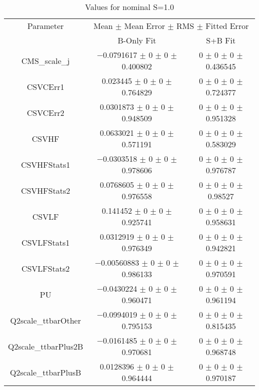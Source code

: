 \begin{table}
\centering
\caption{Values for nominal S=1.0}
\begin{tabular}{ccc}
\toprule
Parameter & \multicolumn{2}{c}{Mean $\pm$ Mean Error $\pm$ RMS $\pm$ Fitted Error}\\
 & B-Only Fit & S+B Fit\\
\midrule
CMS\_scale\_j & \num{-0.0791617} $\pm$ \num{0} $\pm$ \num{0} $\pm$ \num{0.400802} & \num{0} $\pm$ \num{0} $\pm$ \num{0} $\pm$ \num{0.436545}\\
CSVCErr1 & \num{0.023445} $\pm$ \num{0} $\pm$ \num{0} $\pm$ \num{0.764829} & \num{0} $\pm$ \num{0} $\pm$ \num{0} $\pm$ \num{0.724377}\\
CSVCErr2 & \num{0.0301873} $\pm$ \num{0} $\pm$ \num{0} $\pm$ \num{0.948509} & \num{0} $\pm$ \num{0} $\pm$ \num{0} $\pm$ \num{0.951328}\\
CSVHF & \num{0.0633021} $\pm$ \num{0} $\pm$ \num{0} $\pm$ \num{0.571191} & \num{0} $\pm$ \num{0} $\pm$ \num{0} $\pm$ \num{0.583029}\\
CSVHFStats1 & \num{-0.0303518} $\pm$ \num{0} $\pm$ \num{0} $\pm$ \num{0.978606} & \num{0} $\pm$ \num{0} $\pm$ \num{0} $\pm$ \num{0.976787}\\
CSVHFStats2 & \num{0.0768605} $\pm$ \num{0} $\pm$ \num{0} $\pm$ \num{0.976558} & \num{0} $\pm$ \num{0} $\pm$ \num{0} $\pm$ \num{0.98527}\\
CSVLF & \num{0.141452} $\pm$ \num{0} $\pm$ \num{0} $\pm$ \num{0.925741} & \num{0} $\pm$ \num{0} $\pm$ \num{0} $\pm$ \num{0.958631}\\
CSVLFStats1 & \num{0.0312919} $\pm$ \num{0} $\pm$ \num{0} $\pm$ \num{0.976349} & \num{0} $\pm$ \num{0} $\pm$ \num{0} $\pm$ \num{0.942821}\\
CSVLFStats2 & \num{-0.00560883} $\pm$ \num{0} $\pm$ \num{0} $\pm$ \num{0.986133} & \num{0} $\pm$ \num{0} $\pm$ \num{0} $\pm$ \num{0.970591}\\
PU & \num{-0.0430224} $\pm$ \num{0} $\pm$ \num{0} $\pm$ \num{0.960471} & \num{0} $\pm$ \num{0} $\pm$ \num{0} $\pm$ \num{0.961194}\\
Q2scale\_ttbarOther & \num{-0.0994019} $\pm$ \num{0} $\pm$ \num{0} $\pm$ \num{0.795153} & \num{0} $\pm$ \num{0} $\pm$ \num{0} $\pm$ \num{0.815435}\\
Q2scale\_ttbarPlus2B & \num{-0.0161485} $\pm$ \num{0} $\pm$ \num{0} $\pm$ \num{0.970681} & \num{0} $\pm$ \num{0} $\pm$ \num{0} $\pm$ \num{0.968748}\\
Q2scale\_ttbarPlusB & \num{0.0128396} $\pm$ \num{0} $\pm$ \num{0} $\pm$ \num{0.964444} & \num{0} $\pm$ \num{0} $\pm$ \num{0} $\pm$ \num{0.970187}\\

\end{tabular}
\end{table}
